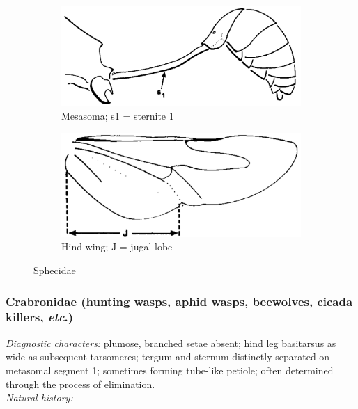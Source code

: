 \documentclass[letterpaper, 11pt]{article}
\begin{document}
\begin{figure}[ht!]
    \centering
    \begin{subfigure}[ht!]{0.45\textwidth}
        \includegraphics[width=\textwidth]{SphecidMetasoma}
        \caption{Mesasoma; s1 = sternite 1}
        \label{fig:sphecid1}
    \end{subfigure}
    \qquad
    \begin{subfigure}[ht!]{0.45\textwidth}
        \includegraphics[width=\textwidth]{SphecidWing}
        \caption{Hind wing; J = jugal lobe}
        \label{fig:sphecid2}
    \end{subfigure}
    \caption{Sphecidae \citep[][pg. 281]{goulet1993hymenoptera}}\label{fig:sphecids}
\end{figure}

\subsubsection{Crabronidae (hunting wasps, aphid wasps, beewolves, cicada killers, \textit{etc}.)}
\noindent{}\textit{Diagnostic characters:} plumose, branched setae absent; hind leg basitarsus as wide as subsequent tarsomeres; tergum and sternum distinctly separated on metasomal segment 1; sometimes forming tube-like petiole; often determined through the process of elimination.\\

\noindent{}\textit{Natural history:} \\
\end{document}
